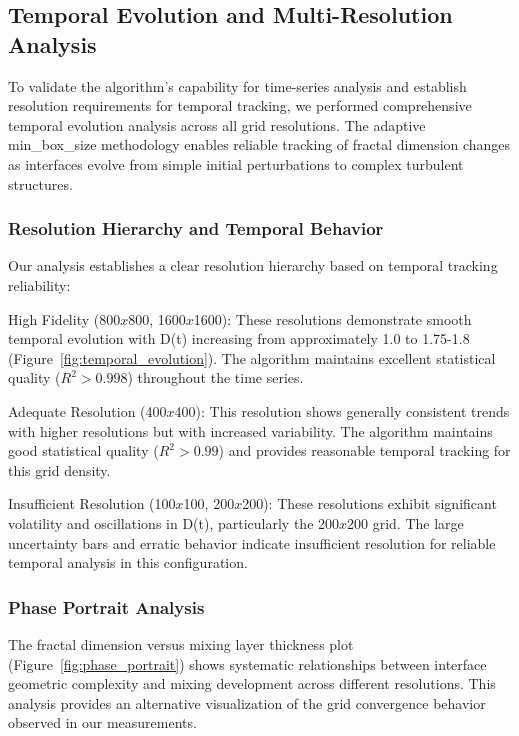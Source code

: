 \documentclass[preprint,12pt]{elsarticle}
\def\textbf#1{#1}%
\def\times{x}%
\begin{document}
\subsection{Temporal Evolution and Multi-Resolution Analysis}
\label{subsec:temporal_evolution}

To validate the algorithm's capability for time-series analysis and establish resolution requirements for temporal tracking, we performed comprehensive temporal evolution analysis across all grid resolutions. The adaptive min\_box\_size methodology enables reliable tracking of fractal dimension changes as interfaces evolve from simple initial perturbations to complex turbulent structures.

\subsubsection{Resolution Hierarchy and Temporal Behavior}

Our analysis establishes a clear resolution hierarchy based on temporal tracking reliability:

\textbf{High Fidelity (800$\times$800, 1600$\times$1600):} These resolutions demonstrate smooth temporal evolution with D(t) increasing from approximately 1.0 to 1.75-1.8 (Figure~\ref{fig:temporal_evolution}). The algorithm maintains excellent statistical quality ($R^2 > 0.998$) throughout the time series.

\textbf{Adequate Resolution (400$\times$400):} This resolution shows generally consistent trends with higher resolutions but with increased variability. The algorithm maintains good statistical quality ($R^2 > 0.99$) and provides reasonable temporal tracking for this grid density.

\textbf{Insufficient Resolution (100$\times$100, 200$\times$200):} These resolutions exhibit significant volatility and oscillations in D(t), particularly the 200$\times$200 grid. The large uncertainty bars and erratic behavior indicate insufficient resolution for reliable temporal analysis in this configuration.

\subsubsection{Phase Portrait Analysis}

The fractal dimension versus mixing layer thickness plot (Figure~\ref{fig:phase_portrait}) shows systematic relationships between interface geometric complexity and mixing development across different resolutions. This analysis provides an alternative visualization of the grid convergence behavior observed in our measurements.
\end{document}
